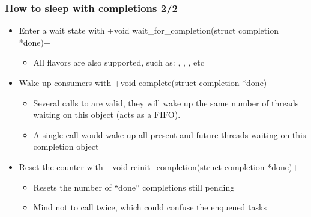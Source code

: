 \begin{frame}[fragile]
  \frametitle{How to sleep with completions 2/2}
  \begin{itemize}
  \item Enter a wait state with
    +void wait_for_completion(struct completion *done)+
    \begin{itemize}
    \item All  flavors are also supported, such as:
      ,
      ,
      , etc
    \end {itemize}
  \item Wake up consumers with
    +void complete(struct completion *done)+
    \begin{itemize}
    \item Several calls to  are valid, they will wake up
      the same number of threads waiting on this object (acts as a FIFO).
    \item A single  call would wake up all present and
      future threads waiting on this completion object
    \end {itemize}
  \item Reset the counter with
    +void reinit_completion(struct completion *done)+
    \begin{itemize}
    \item Resets the number of ``done'' completions still pending
    \item Mind not to call  twice, which could
      confuse the enqueued tasks
    \end{itemize}
  \end{itemize}
\end{frame}
